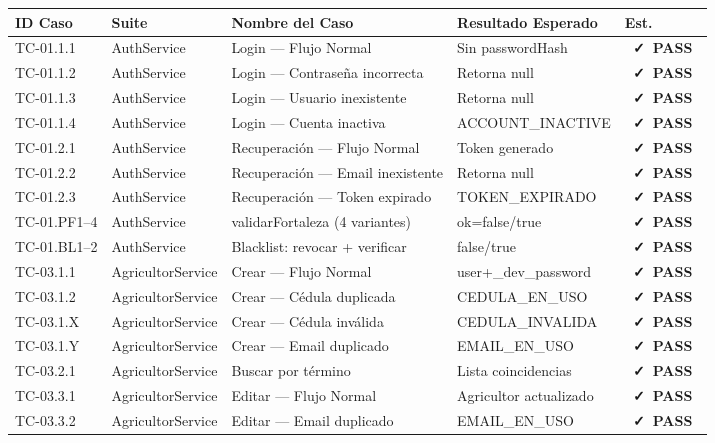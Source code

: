 \documentclass[12pt, a4paper]{article}
\newcommand{\badgePass}{\colorbox{CSuccessBg}{\color{CSuccess}\small\bfseries\ \faCheck\ PASS\ }}
\begin{document}
\footnotesize
\renewcommand{\arraystretch}{1.35}
\begin{longtable}{>{\ttfamily}p{2.1cm} p{2.5cm} p{5.0cm} p{2.5cm} >{\centering\arraybackslash}p{0.9cm}}
  \rowcolor{CRowAlt}
  \normalfont\bfseries ID Caso & \bfseries Suite & \bfseries Nombre del Caso & \bfseries Resultado Esperado & \bfseries\small Est.\\
  \midrule
  \endhead
  TC-01.1.1 & AuthService & Login --- Flujo Normal & Sin passwordHash & \badgePass \\
  \rowcolor{CBg}
  TC-01.1.2 & AuthService & Login --- Contraseña incorrecta & Retorna null & \badgePass \\
  TC-01.1.3 & AuthService & Login --- Usuario inexistente & Retorna null & \badgePass \\
  \rowcolor{CBg}
  TC-01.1.4 & AuthService & Login --- Cuenta inactiva & ACCOUNT\_INACTIVE & \badgePass \\
  TC-01.2.1 & AuthService & Recuperación --- Flujo Normal & Token generado & \badgePass \\
  \rowcolor{CBg}
  TC-01.2.2 & AuthService & Recuperación --- Email inexistente & Retorna null & \badgePass \\
  TC-01.2.3 & AuthService & Recuperación --- Token expirado & TOKEN\_EXPIRADO & \badgePass \\
  \rowcolor{CBg}
  TC-01.PF1--4 & AuthService & validarFortaleza (4 variantes) & ok=false/true & \badgePass \\
  TC-01.BL1--2 & AuthService & Blacklist: revocar + verificar & false/true & \badgePass \\
  \midrule
  TC-03.1.1 & AgricultorService & Crear --- Flujo Normal & user+\_dev\_password & \badgePass \\
  \rowcolor{CBg}
  TC-03.1.2 & AgricultorService & Crear --- Cédula duplicada & CEDULA\_EN\_USO & \badgePass \\
  TC-03.1.X & AgricultorService & Crear --- Cédula inválida & CEDULA\_INVALIDA & \badgePass \\
  \rowcolor{CBg}
  TC-03.1.Y & AgricultorService & Crear --- Email duplicado & EMAIL\_EN\_USO & \badgePass \\
  TC-03.2.1 & AgricultorService & Buscar por término & Lista coincidencias & \badgePass \\
  \rowcolor{CBg}
  TC-03.3.1 & AgricultorService & Editar --- Flujo Normal & Agricultor actualizado & \badgePass \\
  TC-03.3.2 & AgricultorService & Editar --- Email duplicado & EMAIL\_EN\_USO & \badgePass \\

\end{longtable}
\end{document}
